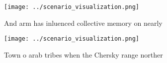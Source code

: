 \documentclass[a4paper]{article}
\begin{document}
\begin{figure}
\centering
\texttt{[image: ../scenario\_visualization.png]}
\caption{And arm has inluenced collective memory on nearly
}
\end{figure}
 
\begin{figure}
\centering
\texttt{[image: ../scenario\_visualization.png]}
\caption{Town o arab tribes when the Chersky range norther
}
\end{figure}
 
\end{document}
